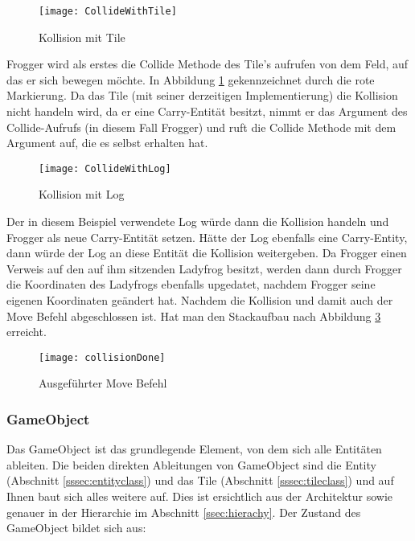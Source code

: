 \documentclass[a4paper,10pt]{report}
\begin{document}
{{{				\begin{figure}[h]			
					\texttt{[image: CollideWithTile]}
					\caption{Kollision mit Tile}
					\label{fig:collisionTile}
				\end{figure}
				\noindent
				Frogger wird als erstes die Collide Methode des Tile's aufrufen von dem Feld, auf das er sich bewegen möchte.
				In Abbildung \ref{fig:collisionTile} gekennzeichnet durch die rote Markierung. 
				\newpage \noindent
				Da das Tile (mit seiner derzeitigen Implementierung) die Kollision nicht handeln wird, da er eine Carry-Entität besitzt,
				nimmt er das Argument des Collide-Aufrufs (in diesem Fall Frogger) und ruft die Collide Methode mit dem Argument auf, die es selbst erhalten hat. 

				\begin{figure}[h]			
					\texttt{[image: CollideWithLog]}
					\caption{Kollision mit Log}
					\label{fig:collisionLog}
				\end{figure}
				\noindent
				Der in diesem Beispiel verwendete Log würde dann die Kollision handeln und Frogger als neue Carry-Entität setzen.
				Hätte der Log ebenfalls eine Carry-Entity, dann würde der Log an diese Entität die Kollision weitergeben.
				Da Frogger einen Verweis auf den auf ihm sitzenden Ladyfrog besitzt, werden dann durch Frogger die Koordinaten des Ladyfrogs ebenfalls upgedatet, 
				nachdem Frogger seine eigenen Koordinaten geändert hat.
				\newline \newline
				\noindent
				Nachdem die Kollision und damit auch der Move Befehl abgeschlossen ist. 
				Hat man den Stackaufbau nach Abbildung \ref{fig:collisionDone} erreicht.

				\begin{figure}			
					\texttt{[image: collisionDone]}
					\caption{Ausgeführter Move Befehl}
					\label{fig:collisionDone}
				\end{figure}
			}			
			\newpage  
			\subsubsection{GameObject}
			{
				\label{sssec:gameobjectclass}			
				
				Das GameObject ist das grundlegende Element, von dem sich alle Entitäten ableiten. Die beiden direkten Ableitungen von GameObject 
				sind die Entity (Abschnitt \ref{sssec:entityclass}) und das Tile (Abschnitt \ref{sssec:tileclass}) und auf Ihnen baut sich alles weitere auf. 
				Dies ist ersichtlich aus der Architektur sowie genauer in der Hierarchie im Abschnitt \ref{ssec:hierachy}.
				\newline \newline \newpage \noindent
				Der Zustand des GameObject bildet sich aus:
				
}}}
\end{document}

